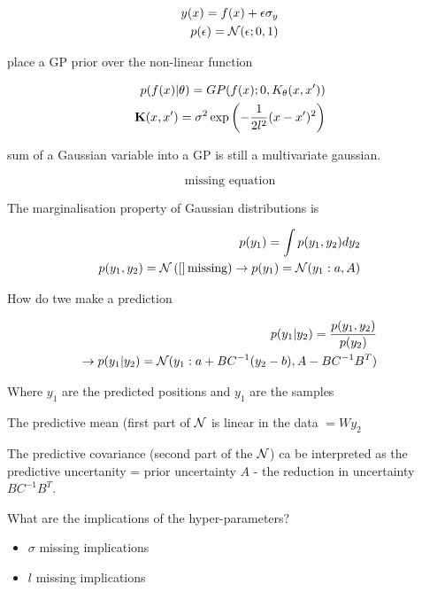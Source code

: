 \documentclass[b5paper]{report}
\begin{document}
\begin{align}
  y(x) = f(x) + \epsilon \sigma_y \\
  p(\epsilon) = \operatorname*{\mathcal{N}}(\epsilon; 0, 1)
\end{align}

place a GP prior over the non-linear function

\begin{align}
  p(f(x)|\theta) = GP(f(x); 0, K_\theta(x,x')) \\
  \operatorname*{\mathbf{K}}(x, x') = \sigma^2 \exp \left( - \frac{1}{2l^2} (x - x')^2\right)
\end{align}

sum of a Gaussian variable into a GP is still a multivariate gaussian.

\begin{equation}
  \text{missing equation}
\end{equation}

The marginalisation property of Gaussian distributions is

\begin{align}
  p(y_1) = \int p(y_1, y_2) dy_2 \\
  p(y_1, y_2) = \operatorname*{\mathcal{N}} \left( \left[ \right] \text{missing} \right) \rightarrow p(y_1) =
  \operatorname*{\mathcal{N}}(y_1: a, A)
\end{align}

How do twe make a prediction

\begin{align}
  p(y_1 | y_2) = \frac{p(y_1, y_2)}{p(y_2)} \\
  \rightarrow p(y_1|y_2) = \operatorname*{\mathcal{N}}(y_1: a + BC^{-1} (y_2 - b), A - BC^{-1}B^T)
\end{align}

Where $y_1$ are the predicted positions and $y_1$ are the samples

The predictive mean (first part of $\operatorname*{\mathcal{N}}$ is linear in the data $=Wy_2$

The predictive covariance (second part of the $\operatorname*{\mathcal{N}}$) ca be interpreted as
the predictive uncertanity = prior uncertainty $A$ - the reduction in
uncertainty $BC^{-1}B^T$.

What are the implications of the hyper-parameters?

\begin{itemize}
  \item $\sigma$ missing implications
  \item $l$ missing implications
\end{itemize}
\end{document}
